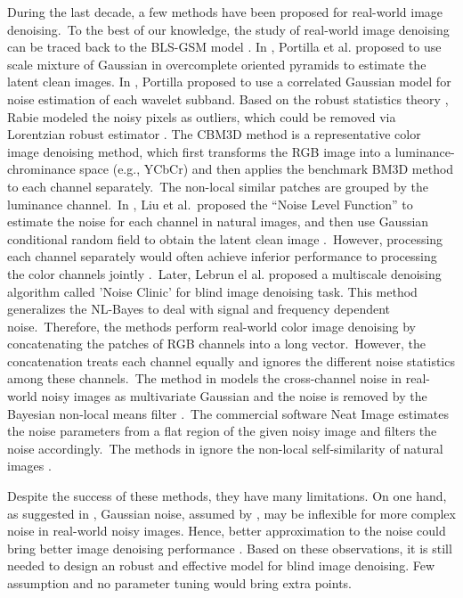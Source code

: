 During the last decade, a few methods have been proposed for real-world image denoising.\ To the best of our knowledge, the study of real-world image denoising can be traced back to the BLS-GSM model \cite{blsgsm}. In \cite{blsgsm}, Portilla et al. proposed to use scale mixture of Gaussian in overcomplete oriented pyramids to estimate the latent clean images. In \cite{fullyblind}, Portilla proposed to use a correlated Gaussian model for noise estimation of each wavelet subband. Based on the robust statistics theory \cite{huber2011robust}, Rabie modeled the noisy pixels as outliers, which could be removed via Lorentzian robust estimator \cite{rabie2005robust}. The CBM3D method \cite{cbm3d} is a representative color image denoising method, which first transforms the RGB image into a luminance-chrominance space (e.g., YCbCr) and then applies the benchmark BM3D method \cite{bm3d} to each channel separately.\ The non-local similar patches are grouped by the luminance channel.\ In \cite{Liu2008}, Liu et al.\ proposed the ``Noise Level Function'' to estimate the noise for each channel in natural images, and then use Gaussian conditional random field to obtain the latent clean image \cite{Liu2008}.\ However, processing each channel separately would often achieve inferior performance to processing the color channels jointly \cite{mairal2008sparse}.\ Later, Lebrun el al. proposed a multiscale denoising algorithm called 'Noise Clinic' \cite{noiseclinic} for blind image denoising task. This method generalizes the NL-Bayes \cite{nlbayes} to deal with signal and frequency dependent noise.\ Therefore, the methods \cite{noiseclinic,ncwebsite,Zhu_2016_CVPR} perform real-world color image denoising by concatenating the patches of RGB channels into a long vector.\ However, the concatenation treats each channel equally and ignores the different noise statistics among these channels.\ The method in \cite{crosschannel2016} models the cross-channel noise in real-world noisy images as multivariate Gaussian and the noise is removed by the Bayesian non-local means filter \cite{kervrann2007bayesian}.\ The commercial software Neat Image \cite{neatimage} estimates the noise parameters from a flat region of the given noisy image and filters the noise accordingly.\ The methods in \cite{crosschannel2016,neatimage} ignore the non-local self-similarity of natural images \cite{bm3d,wnnm}. 


Despite the success of these methods, they have many limitations. On one hand, as suggested in \cite{Liu2008,noiseclinic}, Gaussian noise, assumed by \cite{fullyblind,rabie2005robust,Liu2008}, may be inflexible for more complex noise in real-world noisy images. Hence, better approximation to the noise could bring better image denoising performance \cite{Liu2008,noiseclinic}. Based on these observations, it is still needed to design an robust and effective model for blind image denoising. Few assumption and no parameter tuning would bring extra points.


